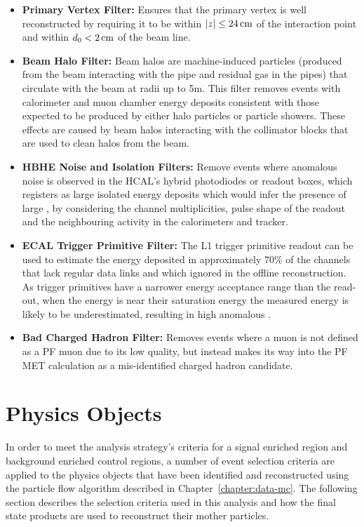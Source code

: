 \begin{itemize}
\item \textbf{Primary Vertex Filter:} Ensures that the primary vertex is well reconstructed by requiring it to be within $|z| \leq 24\,\text{cm}$ of the interaction point and within $d_{0} < 2\,\text{cm}$ of the beam line.
\item \textbf{Beam Halo Filter:} Beam halos are machine-induced particles (\ie produced from the beam interacting with the pipe and residual gas in the pipes) that circulate with the beam at radii up to 5m. This filter removes events with calorimeter and muon chamber energy deposits consistent with those expected to be produced by either halo particles or particle showers.
These effects are caused by beam halos interacting with the collimator blocks that are used to clean halos from the beam.
\item \textbf{HBHE Noise and Isolation Filters:} Remove events where anomalous noise is observed in the HCAL's hybrid photodiodes or readout boxes, which registers as large isolated energy deposits which would infer the presence of large \MET, by considering the channel multiplicities, pulse shape of the readout and the neighbouring activity in the calorimeters and tracker.
\item \textbf{ECAL Trigger Primitive Filter:} The L1 trigger primitive readout can be used to estimate the energy deposited in approximately 70\% of the channels that lack regular data links and which ignored in the offline reconstruction. As trigger primitives have a narrower energy acceptance range than the read-out, when the energy is near their saturation energy the measured energy is likely to be underestimated, resulting in high anomalous \MET. 
\item \textbf{Bad Charged Hadron Filter:} Removes events where a muon is not defined as a PF muon due to its low quality, but instead makes its way into the PF MET calculation as a mis-identified charged hadron candidate.
\end{itemize}

\section{Physics Objects}\label{sec:physicsObjects}
In order to meet the analysis strategy's criteria for a signal enriched region and background enriched control regions, a number of event selection criteria are applied to the physics objects that have been identified and reconstructed using the particle flow algorithm described in Chapter~\ref{chapter:data-mc}.
The following section describes the selection criteria used in this analysis and how the final state products are used to reconstruct their mother particles.

